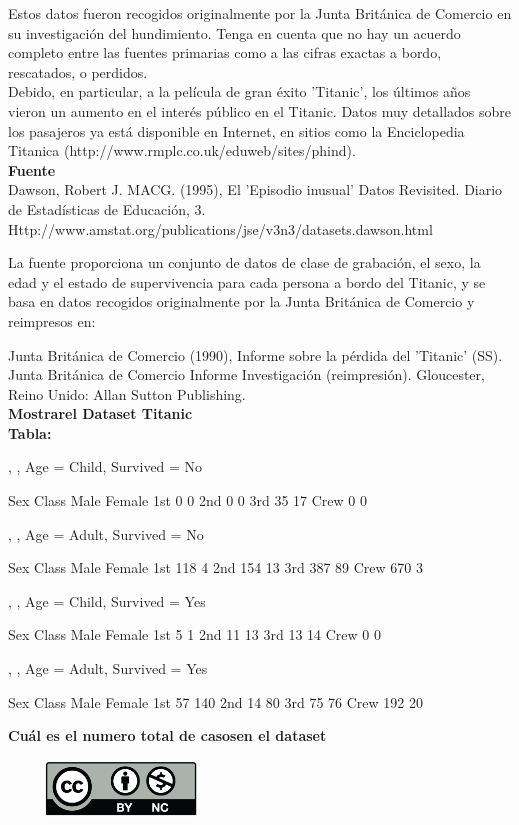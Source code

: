 \documentclass[12pt]{report}
\begin{document}
Estos datos fueron recogidos originalmente por la Junta Británica de Comercio en su investigación del hundimiento. Tenga en cuenta que no hay un acuerdo completo entre las fuentes primarias como a las cifras exactas a bordo, rescatados, o perdidos.\\

Debido, en particular, a la película de gran éxito 'Titanic', los últimos años vieron un aumento en el interés público en el Titanic. Datos muy detallados sobre los pasajeros ya está disponible en Internet, en sitios como la Enciclopedia Titanica (http://www.rmplc.co.uk/eduweb/sites/phind).\\

\textbf{Fuente}\\

Dawson, Robert J. MACG. (1995), El 'Episodio inusual' Datos Revisited. Diario de Estadísticas de Educación, 3. Http://www.amstat.org/publications/jse/v3n3/datasets.dawson.html

La fuente proporciona un conjunto de datos de clase de grabación, el sexo, la edad y el estado de supervivencia para cada persona a bordo del Titanic, y se basa en datos recogidos originalmente por la Junta Británica de Comercio y reimpresos en:

Junta Británica de Comercio (1990), Informe sobre la pérdida del 'Titanic' (SS). Junta Británica de Comercio Informe Investigación (reimpresión). Gloucester, Reino Unido: Allan Sutton Publishing.\\

\textbf{Mostrarel Dataset Titanic}\\

\textbf{Tabla:}\\
\begin{Schunk}
\begin{Soutput}
, , Age = Child, Survived = No

      Sex
Class  Male Female
  1st     0      0
  2nd     0      0
  3rd    35     17
  Crew    0      0

, , Age = Adult, Survived = No

      Sex
Class  Male Female
  1st   118      4
  2nd   154     13
  3rd   387     89
  Crew  670      3

, , Age = Child, Survived = Yes

      Sex
Class  Male Female
  1st     5      1
  2nd    11     13
  3rd    13     14
  Crew    0      0

, , Age = Adult, Survived = Yes

      Sex
Class  Male Female
  1st    57    140
  2nd    14     80
  3rd    75     76
  Crew  192     20
\end{Soutput}
\end{Schunk}

\textbf{Cuál es el numero total de casosen el dataset}\\


\begin{center}
\includegraphics[width=6cm, height=1.5cm]{cc.jpg}
\end{center}
\end{document}
